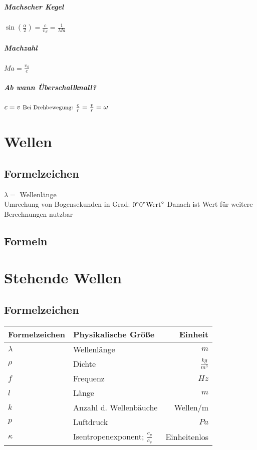 \documentclass[12pt, a4paper]{scrreprt}
\begin{document}
\vspace*{1cm}
\paragraph{Machscher Kegel} \dotfill \(\sin \left( \frac{\alpha}{2} \right) = \frac{c}{v_S} = \frac{1}{Ma}\)
\paragraph{Machzahl} \dotfill \(Ma = \frac{v_S}{c}\)
\paragraph{Ab wann Überschallknall?} \dotfill \(c = v \text{ \footnotesize Bei Drehbewegung: }\frac{c}{r} = \frac{v}{r} = \omega\)





\chapter{Wellen}

\section{Formelzeichen}
\(\lambda=\) \dotfill Wellenlänge\\
Umrechung von Bogensekunden in Grad: \dotfill \(0 \degree 0\degree \text{Wert}\degree\) Danach ist Wert für weitere Berechnungen nutzbar

\section{Formeln}

\chapter{Stehende Wellen}

\section{Formelzeichen}

\begin{center}
  \makegapedcells{}
  \begin{tabular}{l | l | r}
    Formelzeichen & Physikalische Größe & Einheit\\\hline \hline
    \(\lambda\) & Wellenlänge & \(m\)\\ \hline
    \(\rho\) & Dichte & \(\frac{kg}{m^3}\)\\ \hline
    \(f\) & Frequenz & \(Hz\)\\ \hline
    \(l\) & Länge & \(m\)\\ \hline
    \(k\) & Anzahl d. Wellenbäuche & Wellen/m\\ \hline
    \(p\) & Luftdruck & \(Pa\)\\ \hline
    \(\kappa\) & Isentropenexponent; \(\frac{c_p}{c_v}\) & Einheitenlos\\ \hline
  \end{tabular}
\end{center}
\end{document}
